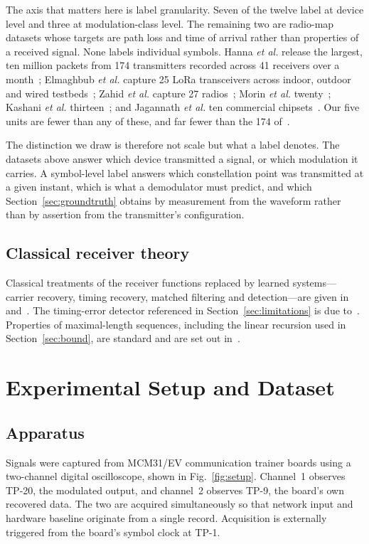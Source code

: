 \documentclass{ieeeaccess}
\begin{document}
The axis that matters here is label granularity. Seven of the twelve label at
device level and three at modulation-class level. The remaining two are
radio-map datasets whose targets are path loss and time of arrival rather than
properties of a received signal. None labels individual symbols. Hanna \textit{et al.} release the
largest, ten million packets from 174 transmitters recorded across 41 receivers
over a month~\cite{hanna2022WiSig}; Elmaghbub \textit{et al.} capture 25 LoRa
transceivers across indoor, outdoor and wired
testbeds~\cite{bub2021usecase}; Zahid \textit{et al.} capture 27
radios~\cite{zahid2025comrad}; Morin \textit{et al.}
twenty~\cite{Morin2019Transmitter}; Kashani \textit{et al.}
thirteen~\cite{kashani2024BLE}; and Jagannath \textit{et al.} ten commercial
chipsets~\cite{jagannat2024commercialDevice}. Our five units are fewer than any
of these, and far fewer than the 174 of~\cite{hanna2022WiSig}.

The distinction we draw is therefore not scale but what a label denotes. The
datasets above answer which device transmitted a signal, or which modulation it
carries. A symbol-level label answers which constellation point was transmitted
at a given instant, which is what a demodulator must predict, and which
Section~\ref{sec:groundtruth} obtains by measurement from the waveform rather
than by assertion from the transmitter's configuration.

\subsection{Classical receiver theory}
Classical treatments of the receiver functions replaced by learned
systems---carrier recovery, timing recovery, matched filtering and
detection---are given in~\cite{proakis2007digital} and~\cite{mengali1997sync}.
The timing-error detector referenced in Section~\ref{sec:limitations} is due
to~\cite{gardner1986ted}. Properties of maximal-length sequences, including the
linear recursion used in Section~\ref{sec:bound}, are standard and are set
out in~\cite{golomb1982shift}.

\section{Experimental Setup and Dataset}
\label{sec:dataset}

\subsection{Apparatus}
Signals were captured from MCM31/EV communication trainer boards using a
two-channel digital oscilloscope, shown in Fig.~\ref{fig:setup}. Channel~1
observes TP-20, the modulated output, and channel~2 observes TP-9, the board's
own recovered data. The two are acquired simultaneously so that network input
and hardware baseline originate from a single record. Acquisition is externally
triggered from the board's symbol clock at TP-1.
\end{document}
